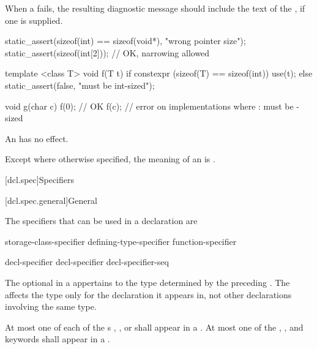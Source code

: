 \pnum
\recommended
When a  fails,
the resulting diagnostic message should include the text of
the , if one is supplied.
\begin{example}
\begin{codeblock}
static_assert(sizeof(int) == sizeof(void*), "wrong pointer size");
static_assert(sizeof(int[2]));          // OK, narrowing allowed

template <class T>
void f(T t) {
  if constexpr (sizeof(T) == sizeof(int)) {
    use(t);
  } else {
    static_assert(false, "must be int-sized");
  }
}

void g(char c) {
  f(0);             // OK
  f(c);             // error on implementations where : must be -sized
}
\end{codeblock}
\end{example}

\pnum
An  has no effect.

\pnum
Except where otherwise specified, the meaning of an 
is .

[dcl.spec]{Specifiers}%

[dcl.spec.general]{General}%

\pnum
{}%
The specifiers that can be used in a declaration are
\begin{bnf}
\br
    storage-class-specifier\br
    defining-type-specifier\br
    function-specifier\br
    \br
    \br
    \br
    \br
    \br
\end{bnf}

\begin{bnf}
\br
    decl-specifier \br
    decl-specifier decl-specifier-seq
\end{bnf}

The optional  in a 
appertains to the type determined by the preceding
. The 
affects the type only for the declaration it appears in, not other declarations involving the
same type.

\pnum
At most one of each of the s
, , or 
shall appear in a .
At most one of
the , , and  keywords
shall appear in a .

